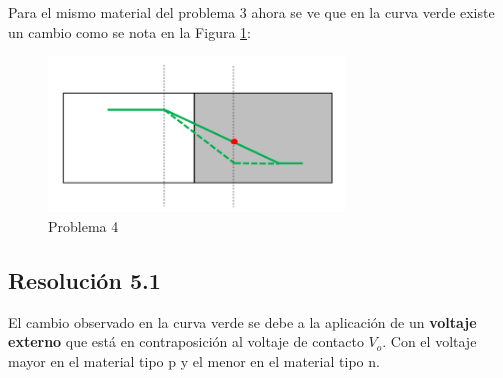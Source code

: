 \documentclass[
  11pt,
  letterpaper,
   addpoints,
   answers
  ]{exam}
\begin{document}
\begin{questions}
\question
Para el mismo material del problema 3 ahora se ve que en la curva verde existe un cambio como se nota en la Figura \ref{fig:p4}:


\begin{figure}[H]
    \centering
    \includegraphics[width=0.7\textwidth]{../figures/Auxiliar_2_2}
    \caption{Problema 4}
    \label{fig:p4}
\end{figure}
\begin{solution}
    \subsection*{Resolución 5.1}

    El cambio observado en la curva verde se debe a la aplicación de un \textbf{voltaje externo} que está en contraposición al voltaje de contacto $V_o$. Con el voltaje mayor en el material tipo p y el menor en el material tipo n.


\end{solution}
\end{questions}
\end{document}
